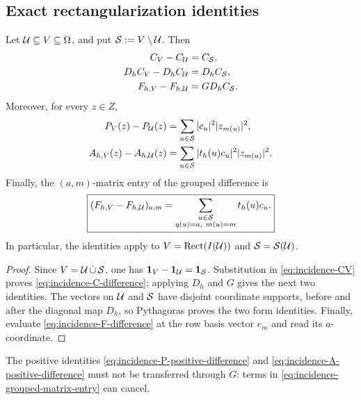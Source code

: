\subsection{Exact rectangularization identities}

\begin{theorem}
\label{thm:incidence-rectangularization-difference}
Let \(\mathcal U\subseteq V\subseteq\Omega\), and put
\(\mathcal S:=V\setminus\mathcal U\).  Then
\begin{align}
 C_V-C_{\mathcal U}&=C_{\mathcal S},
 \label{eq:incidence-C-difference}\\
 D_hC_V-D_hC_{\mathcal U}&=D_hC_{\mathcal S},
 \label{eq:incidence-D-difference}\\
 F_{h,V}-F_{h,\mathcal U}&=GD_hC_{\mathcal S}.
 \label{eq:incidence-F-difference}
\end{align}
Moreover, for every \(z\in Z\),
\begin{align}
 P_V(z)-P_{\mathcal U}(z)
 &=\sum_{u\in\mathcal S}|c_u|^2|z_{m(u)}|^2,
 \label{eq:incidence-P-positive-difference}\\
 A_{h,V}(z)-A_{h,\mathcal U}(z)
 &=\sum_{u\in\mathcal S}|t_h(u)c_u|^2|z_{m(u)}|^2.
 \label{eq:incidence-A-positive-difference}
\end{align}
Finally, the \((a,m)\)-matrix entry of the grouped difference is
\begin{equation}
 \boxed{
 (F_{h,V}-F_{h,\mathcal U})_{a,m}
 =\sum_{\substack{u\in\mathcal S\\q(u)=a,\ m(u)=m}}t_h(u)c_u.}
 \label{eq:incidence-grouped-matrix-entry}
\end{equation}
In particular, the identities apply to
\(V=\operatorname{Rect}(I(\mathcal U))\) and \(\mathcal S=\mathcal S(\mathcal U)\).
\end{theorem}

\begin{proof}
Since \(V=\mathcal U\,\dot\cup\,\mathcal S\), one has
\(\mathbf 1_V-\mathbf 1_{\mathcal U}=\mathbf 1_{\mathcal S}\).  Substitution in
\eqref{eq:incidence-CV} proves \eqref{eq:incidence-C-difference};
applying \(D_h\) and \(G\) gives the next two identities.  The vectors on
\(\mathcal U\) and \(\mathcal S\) have disjoint coordinate supports, before and after
the diagonal map \(D_h\), so Pythagoras proves the two form identities.
Finally, evaluate \eqref{eq:incidence-F-difference} at the row basis vector
\(e_m\) and read its \(a\)-coordinate.
\end{proof}

The positive identities
\eqref{eq:incidence-P-positive-difference} and
\eqref{eq:incidence-A-positive-difference} must not be transferred through
\(G\): terms in \eqref{eq:incidence-grouped-matrix-entry} can cancel.

